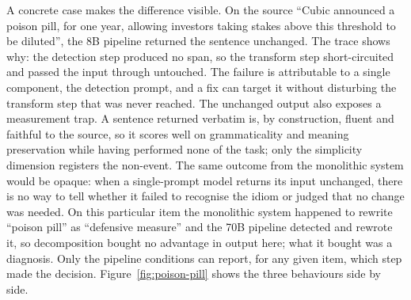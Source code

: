 A concrete case makes the difference visible. On the source ``Cubic announced a poison pill, for one year, allowing investors taking stakes above this threshold to be diluted'', the 8B pipeline returned the sentence unchanged. The trace shows why: the detection step produced no span, so the transform step short-circuited and passed the input through untouched. The failure is attributable to a single component, the detection prompt, and a fix can target it without disturbing the transform step that was never reached. The unchanged output also exposes a measurement trap. A sentence returned verbatim is, by construction, fluent and faithful to the source, so it scores well on grammaticality and meaning preservation while having performed none of the task; only the simplicity dimension registers the non-event. The same outcome from the monolithic system would be opaque: when a single-prompt model returns its input unchanged, there is no way to tell whether it failed to recognise the idiom or judged that no change was needed. On this particular item the monolithic system happened to rewrite ``poison pill'' as ``defensive measure'' and the 70B pipeline detected and rewrote it, so decomposition bought no advantage in output here; what it bought was a diagnosis. Only the pipeline conditions can report, for any given item, which step made the decision. Figure~\ref{fig:poison-pill} shows the three behaviours side by side.

